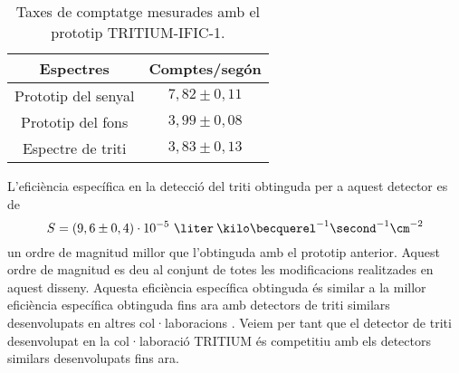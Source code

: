 \begin{table}[htbp]
\centering{}%
\begin{tabular}{cc}
\toprule 
Espectres & Comptes/segón  \tabularnewline
\midrule
\midrule 
Prototip del senyal & $7,82 \pm 0,11$ \tabularnewline
Prototip del fons & $3,99 \pm 0,08$ \tabularnewline  
Espectre de triti & $3,83 \pm 0,13$ \tabularnewline
\bottomrule
\end{tabular}
\caption{Taxes de comptatge mesurades amb el prototip TRITIUM-IFIC-1.}
\label{tab:ContesPerSegonTRITIUMIFIC1}
\end{table}

L'eficiència específica en la detecció del triti obtinguda per a aquest detector es de
$$S = (9,6 \pm 0,4)\cdot{} 10^{-5}~\liter\:\kilo\becquerel^{-1}\second^{-1}\cm^{-2}$$
un ordre de magnitud millor que l'obtinguda amb el prototip anterior. Aquest ordre de magnitud es deu al conjunt de totes les modificacions realitzades en aquest disseny. Aquesta eficiència específica obtinguda és similar a la millor eficiència específica obtinguda fins ara amb detectors de triti similars desenvolupats en altres col·laboracions \cite{Hofstetter1, Hofstetter2}. Veiem per tant que el detector de triti desenvolupat en la col·laboració TRITIUM és competitiu amb els detectors similars desenvolupats fins ara.